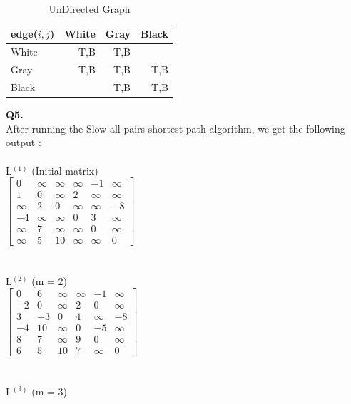 \documentclass[11pt]{article}
\begin{document}
 \begin{table}[htp]
\begin{tabular}{|l|r|r|r|}
\toprule
edge($i,j$) &  White &  Gray &  Black \\
\midrule
White    &       T,B &  T,B &      \\
Gray &       T,B &  T,B &     T,B  \\
Black       &        &  T,B &     T,B \\
\bottomrule
\end{tabular}
\caption {UnDirected Graph}
\end{table} 

\vspace{20mm}
\hline
\vspace{20mm}
\textbf{Q5.}\\
After running the Slow-all-pairs-shortest-path algorithm, we get the following output : \\\\ 
\vspace*{3ex}L$^{(1)}$ (Initial matrix)\\
$\begin{bmatrix}
0 & \infty & \infty & \infty & -1 & \infty\\
1 & 0 & \infty & 2 & \infty & \infty\\
\infty & 2 & 0 & \infty & \infty & -8\\
-4 & \infty & \infty & 0 & 3 & \infty\\
\infty & 7 & \infty & \infty & 0 & \infty\\
\infty & 5 & 10 & \infty & \infty & 0
\end{bmatrix}$\\\\\\
\vspace*{3ex}L$^{(2)}$ (m = 2)\\
$\begin{bmatrix}
0 & 6 & \infty & \infty & -1 & \infty\\
-2 & 0 & \infty & 2 & 0 & \infty\\
3 & -3 & 0 & 4 & \infty & -8\\
-4 & 10 & \infty & 0 & -5 & \infty\\
8 & 7 & \infty & 9 & 0 & \infty\\
6 & 5 & 10 & 7 & \infty & 0
\end{bmatrix}$\\\\\\
\vspace*{3ex}L$^{(3)}$ (m = 3)\\
\end{document}
